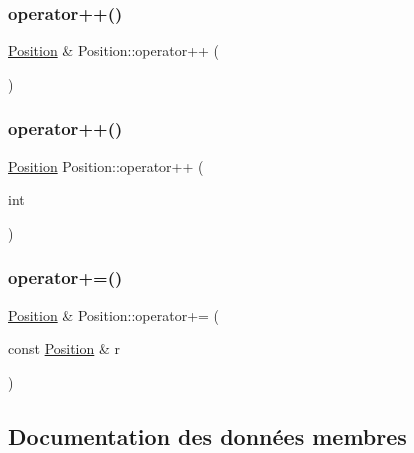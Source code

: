 \mbox{\label{structPosition_ae020c1f70717b7e5c4a2202bed3ea0e2}} 
\subsubsection{\texorpdfstring{operator++()}{operator++()}\hspace{0.1cm}{\footnotesize\ttfamily [1/2]}}
{\footnotesize\ttfamily \hyperlink{structPosition}{Position} \& Position\+::operator++ (\begin{DoxyParamCaption}{ }\end{DoxyParamCaption})}

\mbox{\label{structPosition_a512547e3eeacaa34f1b9207d6054d998}} 
\subsubsection{\texorpdfstring{operator++()}{operator++()}\hspace{0.1cm}{\footnotesize\ttfamily [2/2]}}
{\footnotesize\ttfamily \hyperlink{structPosition}{Position} Position\+::operator++ (\begin{DoxyParamCaption}\item[{int}]{ }\end{DoxyParamCaption})}

\mbox{\label{structPosition_ade2e129796afdf1df8769392c2c9aa59}} 
\subsubsection{\texorpdfstring{operator+=()}{operator+=()}}
{\footnotesize\ttfamily \hyperlink{structPosition}{Position} \& Position\+::operator+= (\begin{DoxyParamCaption}\item[{const \hyperlink{structPosition}{Position} \&}]{r }\end{DoxyParamCaption})}



\subsection{Documentation des données membres}
\mbox{\label{structPosition_aeda152ffeee17ae5be9c02327b2408d8}} 
